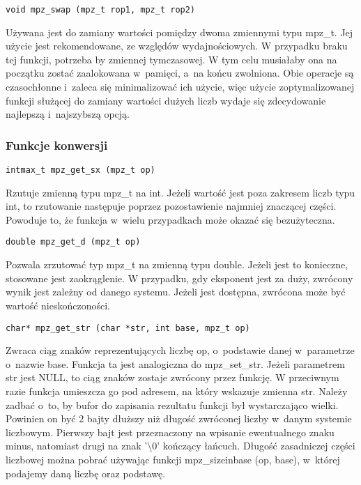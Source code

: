 \begin{lstlisting}
void mpz_swap (mpz_t rop1, mpz_t rop2)
\end{lstlisting}

Używana jest do zamiany wartości pomiędzy dwoma zmiennymi typu mpz\_t. Jej użycie jest rekomendowane, ze względów wydajnościowych. W przypadku braku tej funkcji, potrzeba by zmiennej tymczasowej. W tym celu musiałaby ona na początku zostać zaalokowana w~pamięci, a~na końcu zwolniona. Obie operacje są czasochłonne i~zaleca się minimalizować ich użycie, więc użycie zoptymalizowanej funkcji służącej do zamiany wartości dużych liczb wydaje się zdecydowanie najlepszą i~najszybszą opcją.

\subsubsection{Funkcje konwersji}

\begin{lstlisting}
intmax_t mpz_get_sx (mpz_t op)
\end{lstlisting}

Rzutuje zmienną typu mpz\_t na int. Jeżeli wartość jest poza zakresem liczb typu int, to rzutowanie następuje poprzez pozostawienie najmniej znaczącej części. Powoduje to, że funkcja w~wielu przypadkach może okazać się bezużyteczna.

\begin{lstlisting}
double mpz_get_d (mpz_t op)
\end{lstlisting}

Pozwala zrzutować typ mpz\_t na zmienną typu double. Jeżeli jest to konieczne, stosowane jest zaokrąglenie. W przypadku, gdy eksponent jest za duży, zwrócony wynik jest zależny od danego systemu. Jeżeli jest dostępna, zwrócona może być wartość nieskończoności.

\begin{lstlisting}
char* mpz_get_str (char *str, int base, mpz_t op)
\end{lstlisting}

Zwraca ciąg znaków reprezentujących liczbę op, o~podstawie danej w~parametrze o~nazwie base. Funkcja ta jest analogiczna do mpz\_set\_str. Jeżeli parametrem str jest NULL, to ciąg znaków zostaje zwrócony przez funkcję. W przeciwnym razie funkcja umieszcza go pod adresem, na który wskazuje zmienna str. Należy zadbać o~to, by bufor do zapisania rezultatu funkcji był wystarczająco wielki. Powinien on być $2$ bajty dłuższy niż długość zwróconej liczby w~danym systemie liczbowym. Pierwszy bajt jest przeznaczony na wpisanie ewentualnego znaku minus, natomiast drugi na znak '\textbackslash$0$' kończący łańcuch. Długość zasadniczej części liczbowej można pobrać używając funkcji mpz\_sizeinbase (op, base), w~której podajemy daną liczbę oraz podstawę.

